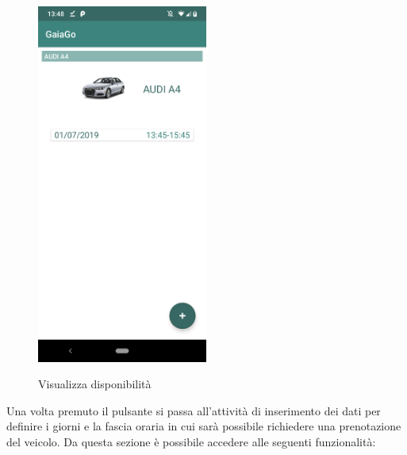 \begin{figure}[H] 
	\centering 
	\includegraphics[width=0.5\textwidth]{res/images/disponibilita.png}\\
	\caption{Visualizza disponibilità}
	\label{disponibilità1}
\end{figure}
\pagebreak
Una volta premuto il pulsante si passa all'attività di inserimento dei dati per definire i giorni e la fascia oraria in cui sarà possibile richiedere una prenotazione del veicolo. 
Da questa sezione è possibile accedere alle seguenti funzionalità:
